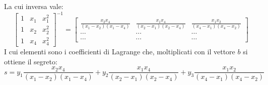 \documentclass{book}
\begin{document}
La cui inversa vale:\begin{equation*}
	{\begin{bmatrix}
			1 & x_{1} & x_{1}^{2} \\
			1 & x_{2} & x_{2}^{2} \\
			1 & x_{4} & x_{4}^{2}
		\end{bmatrix}}^{-1}=\begin{bmatrix}
		\frac{x_{2}x_{4}}{(x_{1}-x_{2})(x_{1}-x_{4})}
		       & \frac{x_{1}x_{4}}{(x_{2}-x_{1})(x_{2}-x_{4})}
		       & \frac{x_{1}x_{2}}{(x_{4}-x_{1})(x_{4}-x_{2})}          \\
		\cdots & \cdots                                        & \cdots \\
		\cdots & \cdots                                        & \cdots
	\end{bmatrix}
\end{equation*}
I cui elementi sono i coefficienti di Lagrange che, moltiplicati con il vettore \(b\) si ottiene il segreto:\begin{equation*}
	s=y_{1}\frac{x_{2}x_{4}}{(x_{1}-x_{2})(x_{1}-x_{4})}+y_{2}\frac{x_{1}x_{4}}{(x_{2}-x_{1})(x_{2}-x_{4})}+y_{3} \frac{x_{1}x_{2}}{(x_{4}-x_{1})(x_{4}-x_{2})}
\end{equation*}
\end{document}
